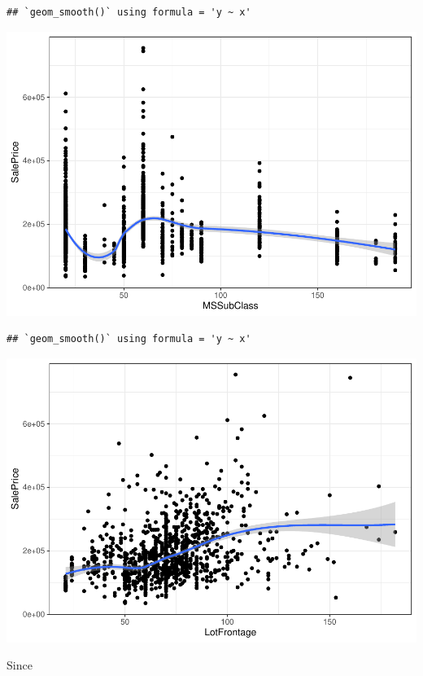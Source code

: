 \documentclass[
]{article}
\begin{document}
\begin{verbatim}
## `geom_smooth()` using formula = 'y ~ x'
\end{verbatim}

\includegraphics{report_files/figure-latex/numerical variables-4.pdf}

\begin{verbatim}
## `geom_smooth()` using formula = 'y ~ x'
\end{verbatim}

\includegraphics{report_files/figure-latex/numerical variables-5.pdf}

Since
\end{document}
